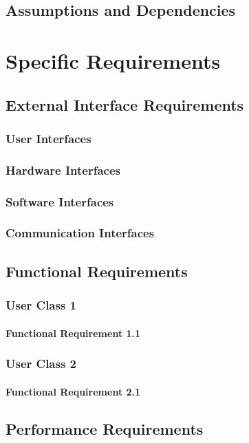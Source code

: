 \documentclass[a4paper,12pt]{book}
\begin{document}
\section{Assumptions and Dependencies}

\chapter{Specific Requirements}
\section{External Interface Requirements}
\subsection{User Interfaces}
\subsection{Hardware Interfaces}
\subsection{Software  Interfaces}
\subsection{Communication Interfaces}

\section{Functional Requirements}
\subsection{User Class 1}
\subsubsection{Functional Requirement 1.1}

\subsection{User Class 2}
\subsubsection{Functional Requirement 2.1}

\section{Performance Requirements}
\end{document}
